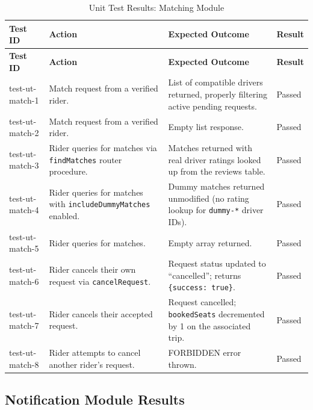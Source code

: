 \small
\begin{longtable}{|p{}|>{\raggedright\arraybackslash}p{}|>{\raggedright\arraybackslash}p{}|p{}|}
\hline
\textbf{Test ID} & \textbf{Action} & \textbf{Expected Outcome} & \textbf{Result} \\
\hline
\endfirsthead

\hline
\textbf{Test ID} & \textbf{Action} & \textbf{Expected Outcome} & \textbf{Result} \\
\hline
\endhead

\hline
\endfoot

\hline
\caption{Unit Test Results: Matching Module}
\endlastfoot

test-ut-match-1 & Match request from a verified rider. & List of compatible drivers returned, properly filtering active pending requests. & Passed \\
\hline
test-ut-match-2 & Match request from a verified rider. & Empty list response. & Passed \\
\hline
test-ut-match-3 & Rider queries for matches via \texttt{findMatches} router procedure. & Matches returned with real driver ratings looked up from the reviews table. & Passed \\
\hline
test-ut-match-4 & Rider queries for matches with \texttt{includeDummyMatches} enabled. & Dummy matches returned unmodified (no rating lookup for \texttt{dummy-*} driver IDs). & Passed \\
\hline
test-ut-match-5 & Rider queries for matches. & Empty array returned. & Passed \\
\hline
test-ut-match-6 & Rider cancels their own request via \texttt{cancelRequest}. & Request status updated to ``cancelled''; returns \texttt{\{success: true\}}. & Passed \\
\hline
test-ut-match-7 & Rider cancels their accepted request. & Request cancelled; \texttt{bookedSeats} decremented by 1 on the associated trip. & Passed \\
\hline
test-ut-match-8 & Rider attempts to cancel another rider's request. & FORBIDDEN error thrown. & Passed \\
\hline
\end{longtable}

\subsection{Notification Module Results}

